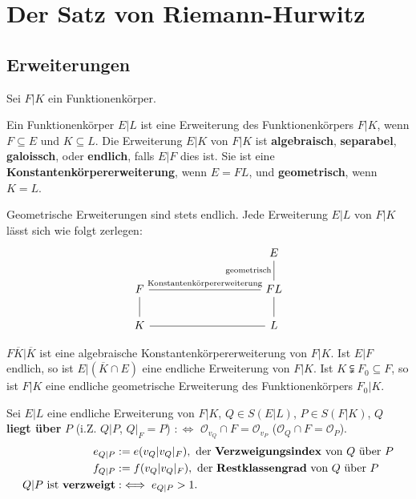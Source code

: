 
\chapter{Der Satz von Riemann-Hurwitz}

\section{Erweiterungen}
Sei $F|K$ ein Funktionenkörper.

\begin{definition}
    Ein Funktionenkörper $E|L$ ist eine Erweiterung des Funktionenkörpers $F|K$, wenn $F \subseteq E$ und $K \subseteq L$.
    Die Erweiterung $E|K$ von $F|K$ ist \textbf{algebraisch}, \textbf{separabel}, \textbf{galoissch}, oder \textbf{endlich}, falls
    $E|F$ dies ist. Sie ist eine \textbf{Konstantenkörpererweiterung}, wenn $E = FL$, und \textbf{geometrisch}, wenn $K=L$.
\end{definition}

\begin{bemerkungnr}
    Geometrische Erweiterungen sind stets endlich. Jede Erweiterung $E|L$ von $F|K$ lässt sich wie folgt zerlegen:
    $$\begin{tikzcd}[column sep=10em]
          & E\\
        F \rar[dash]{\text{Konstantenkörpererweiterung}} & FL \uar[dash]{\text{geometrisch}}\\
        K \rar[dash] \uar[dash] & L \uar[dash]
    \end{tikzcd}$$
\end{bemerkungnr}

\begin{beispiel}
    $F\overline{K}|\overline{K}$ ist eine algebraische Konstantenkörpererweiterung von $F|K$.
    Ist $E|F$ endlich, so ist $E|(\overline{K}\cap E)$ eine endliche Erweiterung von $F|K$.
    Ist $K \subsetneqq F_0 \subseteq F$, so ist $F|K$ eine endliche geometrische Erweiterung des Funktionenkörpers $F_0|K$.
\end{beispiel}

\begin{definition}
    Sei $E|L$ eine endliche Erweiterung von $F|K$, $Q \in S(E|L)$, $P \in S(F|K)$, $Q$ \textbf{liegt über} $P$ 
    (i.Z. $Q|P$, $Q|_F = P$) $: \iff$ $\mathcal{O}_{v_Q} \cap F = \mathcal{O}_{v_P}$ ($\mathcal{O}_Q \cap F = \mathcal{O}_P$).
    \begin{align*}
        e_{Q|P} & := e(v_Q | v_Q|_F), \text{ der \textbf{Verzweigungsindex} von } Q \text{ über } P\\
        f_{Q|P} & := f(v_Q | v_Q|_F), \text{ der \textbf{Restklassengrad} von } Q \text{ über } P\\
        Q|P \text{ ist \textbf{verzweigt}} & :\iff e_{Q|P} > 1.
    \end{align*}
\end{definition}

